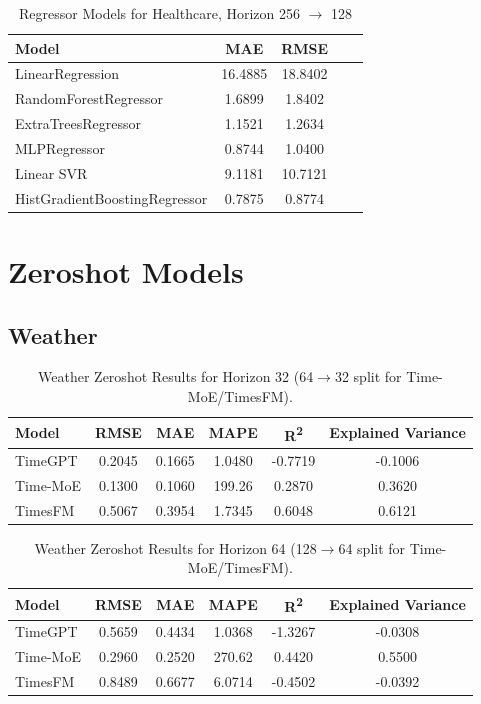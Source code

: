 \begin{table}[h!]
\centering
\begin{tabular}{lcccc}
\hline
Model & MAE & RMSE \\\hline
LinearRegression              & 16.4885 & 18.8402 \\
RandomForestRegressor         & 1.6899  & 1.8402  \\
ExtraTreesRegressor           & 1.1521  & 1.2634  \\
MLPRegressor                  & 0.8744  & 1.0400  \\
Linear SVR                    & 9.1181  & 10.7121 \\
HistGradientBoostingRegressor & 0.7875  & 0.8774  \\
\hline
\end{tabular}
\caption{Regressor Models for Healthcare, Horizon 256 \texorpdfstring{$\to$}{->} 128}
\label{tab:healthcare_256to128_reg}
\end{table}

\newpage

\section{Zeroshot Models}

\subsection{Weather}

\begin{table}[h!]
\centering
\begin{tabular}{lccccc}
\hline
Model      & RMSE   & MAE    & MAPE    & R\textsuperscript{2} & Explained Variance \\
\hline
TimeGPT    & 0.2045 & 0.1665 & 1.0480 & -0.7719 & -0.1006 \\
Time-MoE   & 0.1300 & 0.1060 & 199.26 & 0.2870  & 0.3620 \\
TimesFM    & 0.5067 & 0.3954 & 1.7345 & 0.6048  & 0.6121 \\
\hline
\end{tabular}
\caption{Weather Zeroshot Results for Horizon 32 (64$\to$32 split for Time-MoE/TimesFM).}
\label{tab:weather_h32}
\end{table}

\begin{table}[h!]
\centering
\begin{tabular}{lccccc}
\hline
Model      & RMSE   & MAE    & MAPE    & R\textsuperscript{2} & Explained Variance \\
\hline
TimeGPT    & 0.5659 & 0.4434 & 1.0368 & -1.3267 & -0.0308 \\
Time-MoE   & 0.2960 & 0.2520 & 270.62 & 0.4420  & 0.5500 \\
TimesFM    & 0.8489 & 0.6677 & 6.0714 & -0.4502 & -0.0392 \\
\hline
\end{tabular}
\caption{Weather Zeroshot Results for Horizon 64 (128$\to$64 split for Time-MoE/TimesFM).}
\label{tab:weather_h64}
\end{table}

